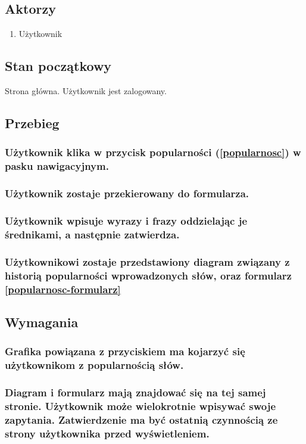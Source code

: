\documentclass[a4paper]{article}
\begin{document}
\subsection*{Aktorzy}
\begin{enumerate}
\item Użytkownik

\end{enumerate}

\subsection*{Stan początkowy}
Strona główna. Użytkownik jest zalogowany.

\subsection{Przebieg}
\subsubsection{Użytkownik klika w przycisk popularności (\ref{popularnosc}) w pasku nawigacyjnym.}
\subsubsection{Użytkownik zostaje przekierowany do formularza.}
\subsubsection{Użytkownik wpisuje wyrazy i frazy oddzielając je średnikami, a następnie zatwierdza. \label{popularnosc-formularz}}
\subsubsection{Użytkownikowi zostaje przedstawiony diagram związany z historią popularności wprowadzonych słów, oraz formularz \ref{popularnosc-formularz}}

\subsection{Wymagania}
\subsubsection{Grafika powiązana z przyciskiem ma kojarzyć się użytkownikom z popularnością słów. \label{popularnosc}}
\subsubsection{Diagram i formularz mają znajdować się na tej samej stronie. Użytkownik może wielokrotnie wpisywać swoje zapytania. Zatwierdzenie ma być ostatnią czynnością ze strony użytkownika przed wyświetleniem.}
\end{document}
